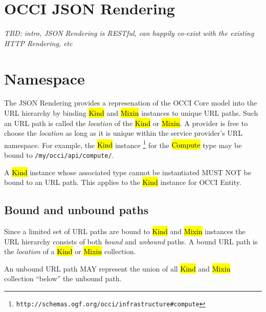 \documentclass[10pt,a4paper]{article}
\begin{document}
\section{OCCI JSON Rendering}
{\em TBD: intro, JSON Rendering is RESTful, can happily co-exist with the
existing HTTP Rendering, etc}

\section{Namespace}

The JSON Rendering provides a represenation of the OCCI Core model into the URL hierarchy by binding
\hl{Kind} and \hl{Mixin} instances to unique URL paths. Such an URL path is called
the {\em location} of the \hl{Kind} or \hl{Mixin}.
A provider is free to choose the {\em location} as long as it is unique
within the service provider's URL namespace.
For example, the \hl{Kind} instance%
\footnote{\tt http://schemas.ogf.org/occi/infrastructure\#compute}
for the \hl{Compute} type may be bound to {\tt /my/occi/api/compute/}.

A \hl{Kind} instance whose associated type cannot be instantiated MUST NOT be
bound to an URL path. This applies to the \hl{Kind} instance for OCCI Entity.

\subsection{Bound and unbound paths}

Since a limited set of URL paths are bound to \hl{Kind} and \hl{Mixin}
instances the URL hierarchy consists of both {\em bound} and {\em unbound}
paths.
A bound URL path is the {\em location} of a \hl{Kind} or \hl{Mixin} collection.

An unbound URL path MAY represent the union of all \hl{Kind} and \hl{Mixin}
collection ``below'' the unbound path.

\end{document}
